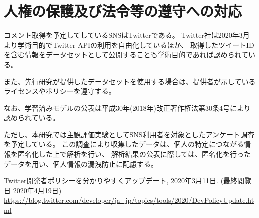
\section{人権の保護及び法令等の遵守への対応}

コメント取得を予定してしているSNSはTwitterである。
Twitter社は2020年3月より学術目的でTwitter APIの利用を自由化しているほか、
取得したツイートIDを含む情報をデータセットとして公開することも学術目的であれば認められている\cite{twitter_2020}。

また、先行研究が提供したデータセットを使用する場合は、提供者が示しているライセンスやポリシーを遵守する。

なお、学習済みモデルの公表は平成30年(2018年)改正著作権法第30条4号により認められている。

ただし、本研究では主観評価実験としてSNS利用者を対象としたアンケート調査を予定している。
この調査により収集したデータは、個⼈の特定につながる情報を匿名化した上で解析を⾏い、
解析結果の公表に際しては、匿名化を⾏ったデータを⽤い、個⼈情報の漏洩防⽌に配慮する。

\vspace{1cm}
{\footnotesize
	\begin{thebibliography}{99}
		\setcounter{enumiv}{11}
		 Twitter開発者ポリシーを分かりやすくアップデート, 2020年3月11日. (最終閲覧日 2020年4月19日) \url{https://blog.twitter.com/developer/ja_jp/topics/tools/2020/DevPolicyUpdate.html}
	\end{thebibliography}
}



